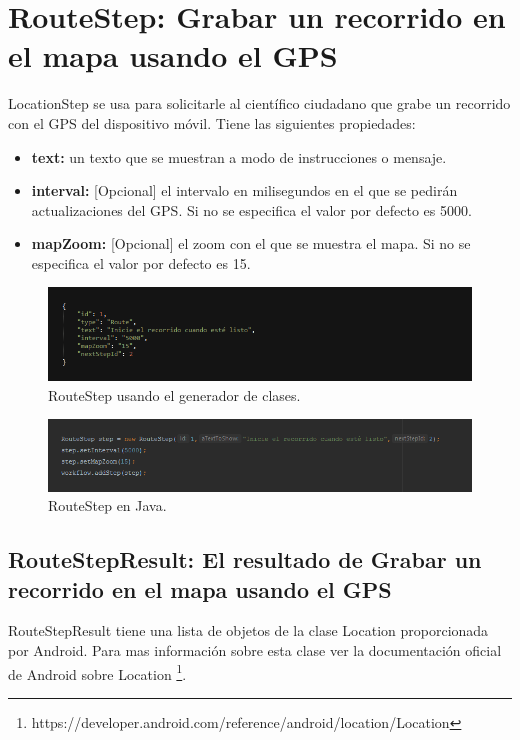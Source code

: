 \section{RouteStep: Grabar un recorrido en el mapa usando el GPS}
LocationStep se usa para solicitarle al científico ciudadano que grabe un recorrido con el GPS del dispositivo móvil. Tiene las siguientes propiedades:

\begin{itemize}
\item \textbf{text:} un texto que se muestran a modo de instrucciones o mensaje.
\item \textbf{interval:} [Opcional] el intervalo en milisegundos en el que se pedirán actualizaciones del GPS. Si no se especifica el valor por defecto es 5000.
\item \textbf{mapZoom:} [Opcional] el zoom con el que se muestra el mapa. Si no se especifica el valor por defecto es 15.
\end{itemize}


\begin{figure}[H]
  \centering
    \includegraphics[scale=0.6]{50-anexos/C-steps/route_json.png} 
    \caption{RouteStep usando el generador de clases.}
\end{figure}	

\begin{figure}[H]
  \centering
    \includegraphics[scale=0.6]{50-anexos/C-steps/route_java.png} 
    \caption{RouteStep en Java.}
\end{figure}


\subsection{RouteStepResult: El resultado de Grabar un recorrido en el mapa usando el GPS}
RouteStepResult tiene una lista de objetos de la clase Location proporcionada por Android.  Para
mas información sobre esta clase ver la documentación oficial de Android sobre Location \footnote{https://developer.android.com/reference/android/location/Location}.






